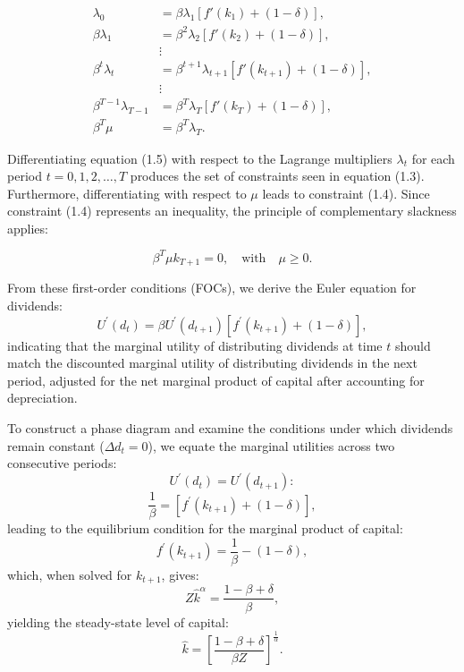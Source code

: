 \documentclass[12pt]{article}
\begin{document}
\begin{equation}
    \begin{aligned}
        \lambda_0 &= \beta \lambda_1 \left[ f'(k_1) + (1 - \delta) \right], \\
        \beta \lambda_1 &= \beta^2 \lambda_2 \left[ f'(k_2) + (1 - \delta) \right], \\
        & \vdots \\
        \beta^t \lambda_t &= \beta^{t+1} \lambda_{t+1} \left[ f'(k_{t+1}) + (1 - \delta) \right], \\
        & \vdots \\
        \beta^{T-1} \lambda_{T-1} &= \beta^T \lambda_T \left[ f'(k_T) + (1 - \delta) \right], \\
        \beta^T \mu &= \beta^T \lambda_T.
    \end{aligned}
\end{equation}



Differentiating equation (1.5) with respect to the Lagrange multipliers \(\lambda_t\) for each period
\(t=0,1,2,\ldots,T\) produces  the set of constraints seen in equation (1.3). Furthermore, differentiating with respect
to \(\mu\) leads to constraint (1.4). Since constraint (1.4) represents an inequality, the principle of complementary
slackness applies:

\[
\beta^T \mu k_{T+1} = 0, \quad \text{with} \quad \mu \geq 0.
\]

From these first-order conditions (FOCs), we derive the Euler equation for dividends:
\[U^{\prime}(d_{t}) = \beta U^{\prime}(d_{t+1})[f^{\prime}(k_{t+1}) + (1-\delta)],\]
indicating that the marginal utility of distributing dividends at time \(t\) should match the discounted marginal
utility of distributing  dividends in the next period, adjusted for the net marginal product of capital after accounting
for depreciation.

To construct a phase diagram and examine the conditions under which dividends remain constant (\(\Delta d_t = 0\)), we
equate the marginal  utilities across two consecutive periods:
\[U^{\prime}(d_t) = U^{\prime}(d_{t+1}):\]
\[\frac{1}{\beta} = [f^{\prime}(k_{t+1}) + (1-\delta)],\]
leading to the equilibrium condition for the marginal product of capital:
\[f^{\prime}(k_{t+1}) = \frac{1}{\beta} - (1-\delta),\]
which, when solved for \(k_{t+1}\), gives:
\[Z\widehat{k}^{\alpha} = \frac{1 - \beta + \delta}{\beta},\]
yielding the steady-state level of capital:
\[\widehat{k} = \left[\frac{1 - \beta + \delta}{\beta Z}\right]^{\frac{1}{\alpha}}.\]
\end{document}
